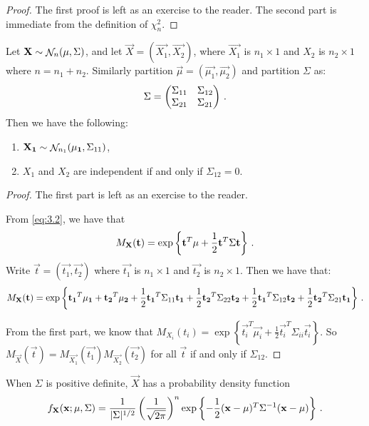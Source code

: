 \begin{proof}
The first proof is left as an exercise to the reader.
The second part is immediate from the definition of $\chi^2_n$.
\end{proof}

\begin{proposition}
  Let $\mathbf{X} \sim \mathop{\mathcal{N}}_n(\mathbf{\mu}, \Sigma)$, and let $\vec{X} = (\vec{X_1}, \vec{X_2})$, where $\vec{X_1}$ is $n_1 \times 1$ and $X_2$ is $n_2 \times 1$ where $n = n_1 + n_2$.
Similarly partition $\vec{\mu} = (\vec{\mu_1}, \vec{\mu_2})$ and partition $\Sigma$ as:
\[
\Sigma =
\begin{pmatrix}
  \Sigma_{11} & \Sigma_{12} \\ \Sigma_{21} & \Sigma_{21}
\end{pmatrix} \, {.}
\]
Then we have the following:
\begin{enumerate}
\item $\mathbf{X_1} \sim \mathop{\mathcal{N}}_{n_1}(\mathbf{\mu_1}, \Sigma_{11})$,
\item $X_1$ and $X_2$ are independent if and only if $\Sigma_{12} = 0$.
\end{enumerate}
\end{proposition}

\begin{proof}
  The first part is left as an exercise to the reader.

From \eqref{eq:3.2}, we have that
\[
M_{\mathbf{X}} (\mathbf{t}) = \exp \left\{ \mathbf{t}^T\mathbf{\mu} + \frac{1}{2} \mathbf{t}^T\Sigma\mathbf{t} \right\} \, {.}
\]
Write $\vec{t} = (\vec{t_1}, \vec{t_2})$ where $\vec{t_1}$ is $n_1 \times 1$ and $\vec{t_2}$ is $n_2 \times 1$. Then we have that:
\[
M_{\mathbf{X}} (\mathbf{t}) = \exp \left\{ \mathbf{t_1}^T\mathbf{\mu_1} + \mathbf{t_2}^T\mathbf{\mu_2} + \frac{1}{2} \mathbf{t_1}^T\Sigma_{11}\mathbf{t_1} + \frac{1}{2} \mathbf{t_2}^T\Sigma_{22}\mathbf{t_2} + \frac{1}{2} \mathbf{t_1}^T\Sigma_{12}\mathbf{t_2} + \frac{1}{2} \mathbf{t_2}^T\Sigma_{21}\mathbf{t_1} \right\} \, {.}
\]

From the first part, we know that $M_{X_i}(t_i) = \exp \left\{ \vec{t_i}^T\vec{\mu_i} + \frac{1}{2}\vec{t_i}^T\Sigma_{ii} \vec{t_i} \right\}$.
So $M_{\vec{X}}(\vec{t}) = M_{\vec{X_1}}(\vec{t_1})M_{\vec{X_2}}(\vec{t_2})$ for all $\vec{t}$ if and only if $\Sigma_{12}$.
\end{proof}

When $\Sigma$ is positive definite, $\vec{X}$ has a probability density function
\[
f_{\mathbf{X}}(\mathbf{x}; \mathbf{\mu}, \Sigma) = \frac{1}{\lvert\Sigma\rvert^{1/2}} \left(\frac{1}{\sqrt{2 \pi}} \right)^n \exp \left\{ -\frac{1}{2} (\mathbf{x} - \mathbf{\mu})^T\Sigma^{-1}(\mathbf{x} - \mathbf{\mu}) \right\} \, {.}
\]

